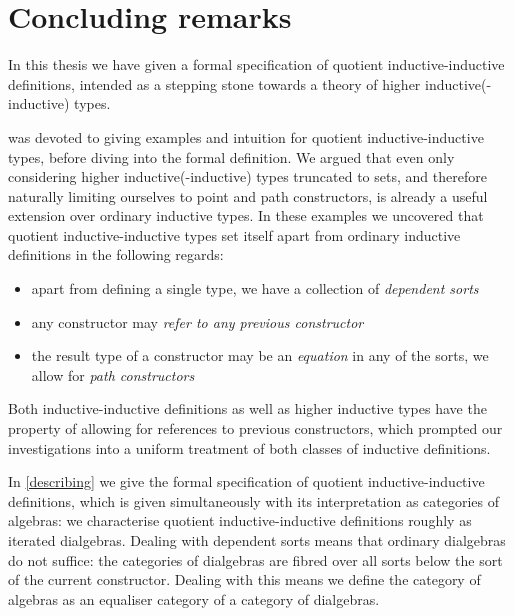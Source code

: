 \chapter{Concluding remarks}
\label{conclusion}

In this thesis we have given a formal specification of quotient
inductive-inductive definitions, intended as a stepping stone towards
a theory of higher inductive(-inductive) types. 

 was devoted to giving examples and intuition for quotient
inductive-inductive types, before diving into the formal
definition. We argued that even only considering higher
inductive(-inductive) types truncated to sets, and therefore naturally
limiting ourselves to point and path constructors, is already a useful
extension over ordinary inductive types. In these examples we
uncovered that quotient inductive-inductive types set itself apart
from ordinary inductive definitions in the following regards:
%
\begin{itemize}
\item apart from defining a single type, we have a collection of \emph{dependent sorts}
\item any constructor may \emph{refer to any previous constructor}
\item the result type of a constructor may be an \emph{equation} in
  any of the sorts, \ie we allow for \emph{path constructors}
\end{itemize}
%
Both inductive-inductive definitions as well as higher inductive types
have the property of allowing for references to previous constructors,
which prompted our investigations into a uniform treatment of both
classes of inductive definitions.

In \cref{describing} we give the formal specification of quotient
inductive-inductive definitions, which is given simultaneously with
its interpretation as categories of algebras: we characterise quotient
inductive-inductive definitions roughly as iterated
dialgebras. Dealing with dependent sorts means that ordinary
dialgebras do not suffice: the categories of dialgebras are fibred
over all sorts below the sort of the current constructor. Dealing with
this means we define the category of algebras as an equaliser category
of a category of dialgebras.

